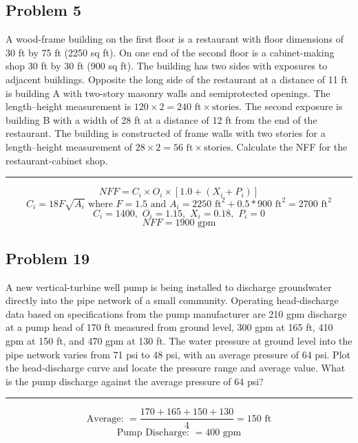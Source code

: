 \subsection*{Problem 5}
A wood-frame building on the first floor is a restaurant with floor dimensions of 30 ft by 75 ft (2250 sq ft). On one end of the second floor is a cabinet-making shop 30 ft by 30 ft (900 sq ft). The building has two sides with exposures to adjacent buildings. Opposite the long side of the restaurant at a distance of 11 ft is building A with two-story masonry walls and semiprotected openings. The length–height measurement is \(120\times2=240\text{ ft}\times\text{stories}\). The second exposure is building B with a width of 28 ft at a distance of 12 ft from the end of the restaurant. The building is constructed of frame walls with two stories for a length–height measurement of \(28\times2=56\text{ ft}\times\text{stories}\). Calculate the NFF for the restaurant-cabinet shop.
\\\rule{5cm}{1pt}
\[NFF=C_i\times O_i\times[1.0+(X_i+P_i)]\]
\[C_i=18F\sqrt{A_i}\text{ where }F=1.5\text{ and } A_i=2250\text{ ft}^2+0.5*900\text{ ft}^2=2700\text{ ft}^2\]
\[C_i=1400,\,\, O_i=1.15,\,\, X_i=0.18,\,\, P_i=0\]
\[NFF=\boxed{1900 \text{ gpm}}\]
\newpage
\subsection*{Problem 19}
A new vertical-turbine well pump is being installed to discharge groundwater directly into the pipe network of a small community. Operating head-discharge data based on specifications from the pump manufacturer are 210 gpm discharge at a pump head of 170 ft measured from ground level, 300 gpm at 165 ft, 410 gpm at 150 ft, and 470 gpm at 130 ft. The water pressure at ground level into the pipe network varies from 71 psi to 48 psi, with an average pressure of 64 psi. Plot the head-discharge curve and locate the pressure range and average value. What is the pump discharge against the average pressure of 64 psi?
\\\rule{5cm}{1pt}
\begin{center}
\end{center}
\[\text{Average: }=\frac{170+165+150+130}{4}=\boxed{150\text{ ft}}\]
\[\text{Pump Discharge: }=\boxed{400\text{ gpm}}\]
\newpage
